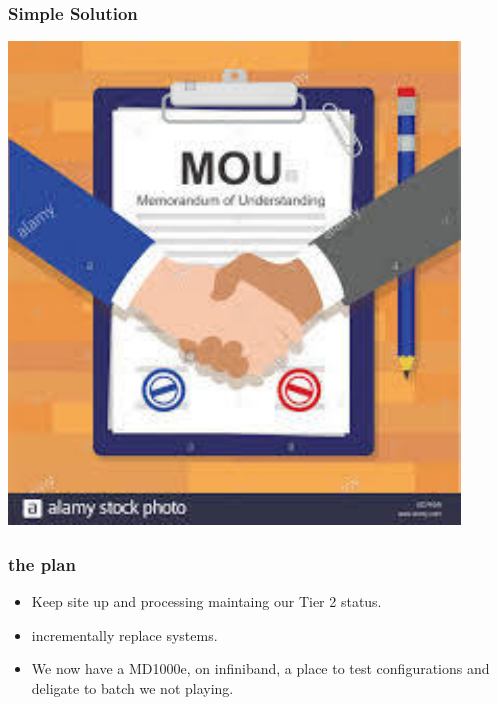 \documentclass{beamer}
\begin{document}
\begin{frame}
  \frametitle{Simple Solution}
    \center\includegraphics[scale=0.5]{MOU-pic.pdf} \\
\end{frame}

\begin{frame}
  \frametitle{the plan}
  \begin{itemize}
    \item Keep site up and processing maintaing our Tier 2 status.
    \item incrementally replace systems.
    \item We now have a MD1000e, on infiniband, a place to test configurations and deligate to batch
        we not playing.
  \end{itemize}
\end{frame}
\end{document}
